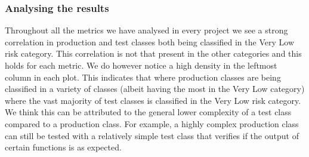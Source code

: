 \subsubsection{Analysing the results}
Throughout all the metrics we have analysed in every project we see a strong correlation in production and test classes both being classified in the Very Low risk category. This correlation is not that present in the other categories and this holds for each metric. We do however notice a high density in the leftmost column in each plot. This indicates that where production classes are being classified in a variety of classes (albeit having the most in the Very Low category) where the vast majority of test classes is classified in the Very Low risk category. We think this can be attributed to the general lower complexity of a test class compared to a production class. For example, a highly complex production class can still be tested with a relatively simple test class that verifies if the output of certain functions is as expected.

